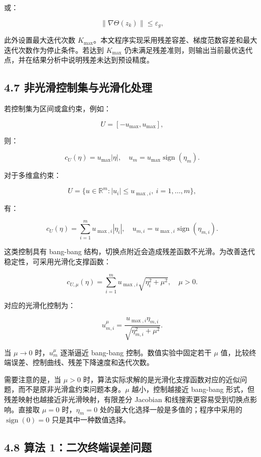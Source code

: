\documentclass[UTF8,a4paper,zihao=-4]{ctexart}
\begin{document}
或：

\[
\|\nabla\Theta(z_k)\|\leq \varepsilon_g,
\]

此外设置最大迭代次数 $K_{\max}$。本文程序实现采用残差容差、梯度范数容差和最大迭代次数作为停止条件。若达到 $K_{\max}$ 仍未满足残差准则，则输出当前最优迭代点，并在结果分析中说明残差未达到预设精度。

\subsection{4.7 非光滑控制集与光滑化处理}

若控制集为区间或盒约束，例如\cite[第128页起]{pontryagin1969}\cite[第3--4页]{avvakumov1995}：

\[
U=[-u_{\max},u_{\max}],
\]

则：

\[
c_U(\eta)=u_{\max}|\eta|,\quad
u_m=u_{\max}\operatorname{sign}(\eta_m).
\]

对于多维盒约束：

\[
U=\{u\in\mathbb{R}^m: |u_i|\leq u_{\max,i},\ i=1,\ldots,m\},
\]

有：

\[
c_U(\eta)=\sum_{i=1}^m u_{\max,i}|\eta_i|,\quad
u_{m,i}=u_{\max,i}\operatorname{sign}(\eta_{m,i}).
\]

这类控制具有 bang-bang 结构，切换点附近会造成残差函数不光滑。为改善迭代稳定性，可采用光滑化支撑函数\cite[第37--51页]{blagodatskikh2001}\cite[第8--9页]{avvakumov1995}：

\[
c_{U,\mu}(\eta)
=
\sum_{i=1}^m u_{\max,i}\sqrt{\eta_i^2+\mu^2},
\quad \mu>0.
\]

对应的光滑化控制为：

\[
u_{m,i}^{\mu}
=
\frac{u_{\max,i}\eta_{m,i}}
{\sqrt{\eta_{m,i}^2+\mu^2}}.
\]

当 $\mu\to 0$ 时，$u_m^\mu$ 逐渐逼近 bang-bang 控制。数值实验中固定若干 $\mu$ 值，比较终端误差、控制曲线、残差下降速度和迭代次数。

需要注意的是，当 $\mu>0$ 时，算法实际求解的是光滑化支撑函数对应的近似问题，而不是原非光滑盒约束问题本身。$\mu$ 越小，控制越接近 bang-bang 形式，但残差映射也越接近非光滑映射，有限差分 Jacobian 和线搜索更容易受到切换点影响。直接取 $\mu=0$ 时，$\eta_m=0$ 处的最大化选择一般是多值的；程序中采用的 $\operatorname{sign}(0)=0$ 只是其中一种数值选择。

\subsection{4.8 算法 1：二次终端误差问题}
\end{document}
